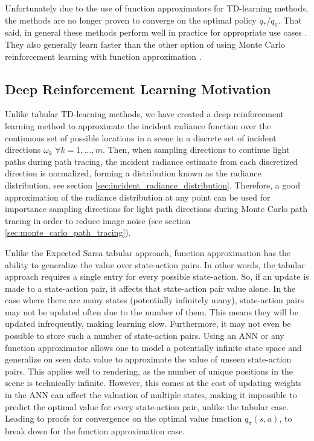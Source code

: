 \documentclass[../dissertation.tex]{subfiles}
\begin{document}
Unfortunately due to the use of function approximators for TD-learning methods, the methods are no longer proven to converge on the optimal policy $q_*$/$q_\pi$. That said, in general these methods perform well in practice for appropriate use cases \cite{lillicrap2015continuous, mnih2013playing}. They also generally learn faster than the other option of using Monte Carlo reinforcement learning with function approximation \cite{sutton2011reinforcement}.

\subsection{Deep Reinforcement Learning Motivation}
\label{sec:deep_rl_motivation}

Unlike tabular TD-learning methods, we have created a deep reinforcement learning method to approximate the incident radiance function over the continuous set of possible locations in a scene in a discrete set of incident directions $\omega_k$ $\forall k=1,...,m$. Then, when sampling directions to continue light paths during path tracing, the incident radiance estimate from each discretized direction is normalized, forming a distribution known as the radiance distribution, see section \ref{sec:incident_radiance_distribution}. Therefore, a good approximation of the radiance distribution at any point can be used for importance sampling directions for light path directions during Monte Carlo path tracing in order to reduce image noise (see section \ref{sec:monte_carlo_path_tracing}).

Unlike the Expected Sarsa tabular approach, function approximation has the ability to generalize the value over state-action pairs. In other words, the tabular approach requires a single entry for every possible state-action. So, if an update is made to a state-action pair, it affects that state-action pair value alone. In the case where there are many states (potentially infinitely many), state-action pairs may not be updated often due to the number of them. This means they will be updated infrequently, making learning slow. Furthermore, it may not even be possible to store such a number of state-action pairs. Using an ANN or any function approximator allows one to model a potentially infinite state space and generalize on seen data value to approximate the value of unseen state-action pairs. This applies well to rendering, as the number of unique positions in the scene is technically infinite. However, this comes at the cost of updating weights in the ANN can affect the valuation of multiple states, making it impossible to predict the optimal value for every state-action pair, unlike the tabular case. Leading to proofs for convergence on the optimal value function $q_\pi(s,a)$, to break down for the function approximation case.
\end{document}

